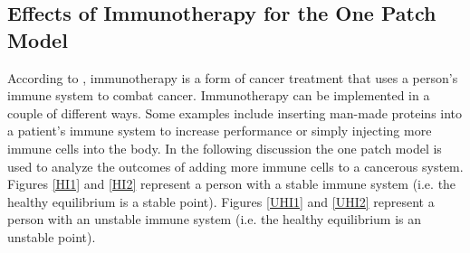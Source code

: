 \documentclass[letter,10pt]{article}
\begin{document}





%
%
%

%
%



  
\subsection{Effects of Immunotherapy for the One Patch Model}

According to \cite{ACS}, immunotherapy is a form of cancer treatment that uses a person's immune system to combat cancer. Immunotherapy can be implemented in a couple of different ways. Some examples include inserting man-made proteins into a patient's immune system to increase performance or simply injecting more immune cells into the body. In the following discussion the one patch model is used to analyze the outcomes of adding more immune cells to a cancerous system. Figures \ref{HI1} and \ref{HI2} represent a person with a stable immune system (i.e. the healthy equilibrium is a stable point).  Figures \ref{UHI1} and \ref{UHI2} represent a person with an unstable immune system (i.e. the healthy equilibrium is an unstable point).
\end{document}
